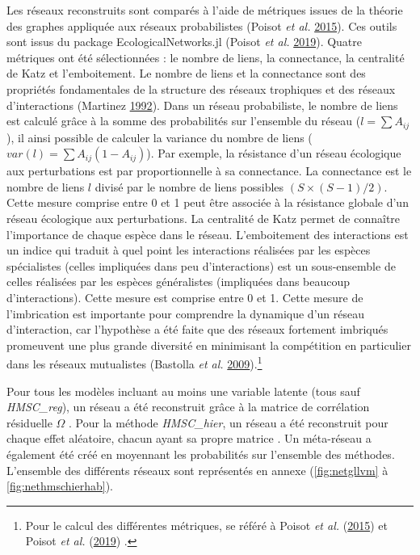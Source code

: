 \documentclass[12pt,]{article}
\begin{document}
Les réseaux reconstruits sont comparés à l'aide de métriques issues de
la théorie des graphes appliquée aux réseaux probabilistes (Poisot
\emph{et al.} \protect\hyperlink{ref-Poisot_2015}{2015}). Ces outils
sont issus du package EcologicalNetworks.jl (Poisot \emph{et al.}
\protect\hyperlink{ref-Poisot_2019}{2019}). Quatre métriques ont été
sélectionnées : le nombre de liens, la connectance, la centralité de
Katz et l'emboitement. Le nombre de liens et la connectance sont des
propriétés fondamentales de la structure des réseaux trophiques et des
réseaux d'interactions (Martinez
\protect\hyperlink{ref-Martinez_1992}{1992}). Dans un réseau
probabiliste, le nombre de liens est calculé grâce à la somme des
probabilités sur l'ensemble du réseau (\(l = \sum A_{ij}\)), il ainsi
possible de calculer la variance du nombre de liens
(\(var(l) = \sum A_{ij} (1 - A_{ij})\)). Par exemple, la résistance d'un
réseau écologique aux perturbations est par proportionnelle à sa
connectance. La connectance est le nombre de liens \(l\) divisé par le
nombre de liens possibles \((S\times(S-1)/2)\). Cette mesure comprise
entre 0 et 1 peut être associée à la résistance globale d'un réseau
écologique aux perturbations. La centralité de Katz permet de connaître
l'importance de chaque espèce dans le réseau. L'emboitement des
interactions est un indice qui traduit à quel point les interactions
réalisées par les espèces spécialistes (celles impliquées dans peu
d'interactions) est un sous-ensemble de celles réalisées par les espèces
généralistes (impliquées dans beaucoup d'interactions). Cette mesure est
comprise entre 0 et 1. Cette mesure de l'imbrication est importante pour
comprendre la dynamique d'un réseau d'interaction, car l'hypothèse a été
faite que des réseaux fortement imbriqués promeuvent une plus grande
diversité en minimisant la compétition en particulier dans les réseaux
mutualistes (Bastolla \emph{et al.}
\protect\hyperlink{ref-Bastolla_2009}{2009}).\footnote{Pour le calcul
  des différentes métriques, se référé à Poisot \emph{et al.}
  (\protect\hyperlink{ref-Poisot_2015}{2015}) et Poisot \emph{et al.}
  (\protect\hyperlink{ref-Poisot_2019}{2019}) .}

Pour tous les modèles incluant au moins une variable latente (tous sauf
\emph{HMSC\_reg}), un réseau a été reconstruit grâce à la matrice de
corrélation résiduelle \(\Omega\) . Pour la méthode \emph{HMSC\_hier},
un réseau a été reconstruit pour chaque effet aléatoire, chacun ayant sa
propre matrice . Un méta-réseau a également été créé en moyennant les
probabilités sur l'ensemble des méthodes. L'ensemble des différents
réseaux sont représentés en annexe (\cref{fig:netgllvm} à
\ref{fig:nethmschierhab}).
\end{document}
